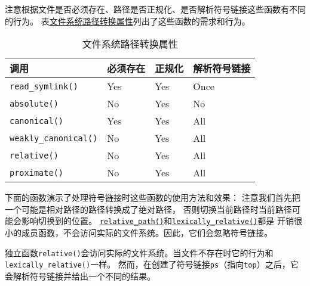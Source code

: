 注意根据文件是否必须存在、路径是否正规化、是否解析符号链接这些函数有不同的行为。
表\hyperref[t20.19]{文件系统路径转换属性}列出了这些函数的需求和行为。
\begin{table}[ht]
    \centering
    \begin{tabular}{l|l|l|l}
        \hline
        \textbf{调用}                  & \textbf{必须存在} & \textbf{正规化} & \textbf{解析符号链接} \\
        \hline
        \texttt{read\_symlink()}     & Yes           & Yes          & Once            \\
        \texttt{absolute()}          & No            & Yes          & No              \\
        \texttt{canonical()}         & Yes           & Yes          & All             \\
        \texttt{weakly\_canonical()} & No            & Yes          & All             \\
        \texttt{relative()}          & No            & Yes          & All             \\
        \texttt{proximate()}         & No            & Yes          & All             \\
        \hline
    \end{tabular}
    \caption{文件系统路径转换属性}
    \label{t20.19}
\end{table}

下面的函数演示了处理符号链接时这些函数的使用方法和效果：
注意我们首先把一个可能是相对路径的路径转换成了绝对路径，
否则切换当前路径时当前路径可能会影响切换到的位置。
\hyperref[ch20.3.2]{\texttt{relative\_path()}}和\hyperref[ch20.3.3]{\texttt{lexically\_relative()}}都是
开销很小的成员函数，不会访问实际的文件系统。因此，它们会忽略符号链接。

独立函数\texttt{relative()}会访问实际的文件系统。当文件不存在时它的行为和\texttt{lexically\_relative()}一样。
然而，在创建了符号链接\texttt{ps}（指向\texttt{top}）之后，它会解析符号链接并给出一个不同的结果。

